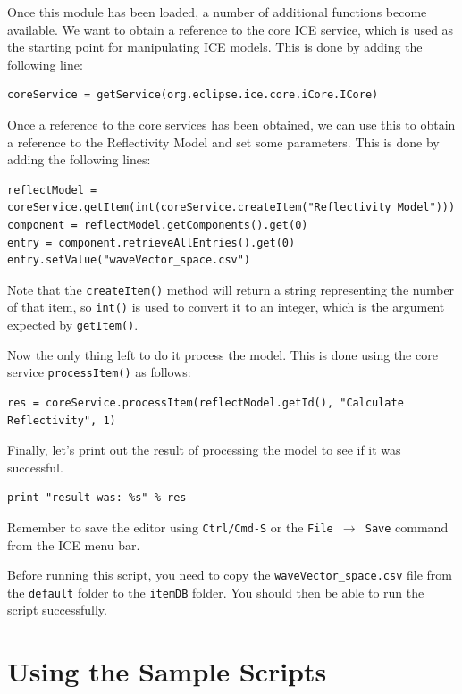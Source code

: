 Once this module has been loaded, a number of additional functions become
available. We want to obtain a reference to the core ICE service, which is used
as the starting point for manipulating ICE models. This is done by adding the
following line:

{\small
\begin{verbatim}
coreService = getService(org.eclipse.ice.core.iCore.ICore)
\end{verbatim}
}

Once a reference to the core services has been obtained, we can use this to
obtain a reference to the Reflectivity Model and set some parameters. This is
done by adding the following lines:

{\small
\begin{verbatim}
reflectModel = coreService.getItem(int(coreService.createItem("Reflectivity Model")))
component = reflectModel.getComponents().get(0)
entry = component.retrieveAllEntries().get(0)
entry.setValue("waveVector_space.csv")
\end{verbatim}
}

Note that the \texttt{createItem()} method will return a string representing the
number of that item, so \texttt{int()} is used to convert it to an integer, which is the
argument expected by \texttt{getItem()}.

Now the only thing left to do it process the model. This is done using the core
service \texttt{processItem()} as follows:

{\small
\begin{verbatim}
res = coreService.processItem(reflectModel.getId(), "Calculate Reflectivity", 1)
\end{verbatim}
}

Finally, let's print out the result of processing the model to see if it was
successful.

{\small
\begin{verbatim}
print "result was: %s" % res
\end{verbatim}
}

Remember to save the editor using \texttt{Ctrl/Cmd-S} or the \texttt{File
$\rightarrow$ Save} command from the ICE menu bar.

Before running this script, you need to copy the \texttt{waveVector\_space.csv}
file from the \texttt{default} folder to the \texttt{itemDB} folder. You should
then be able to run the script successfully.

\section{Using the Sample Scripts}

